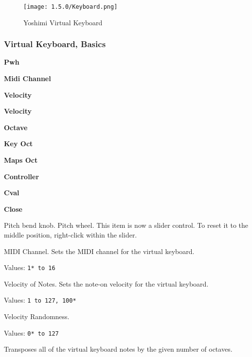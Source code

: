 \begin{figure}[H]
   \centering
   \texttt{[image: 1.5.0/Keyboard.png]}
   \caption{Yoshimi Virtual Keyboard}
   \label{fig:yoshimi_virtual_keyboard}
\end{figure}

\subsubsection{Virtual Keyboard, Basics}
\label{subsubsec:virtual_keyboard_basics}

   \begin{enumber}
      \item \textbf{Pwh}
      \item \textbf{Midi Channel}
      \item \textbf{Velocity}
      \item \textbf{Velocity}
      \item \textbf{Octave}
      \item \textbf{Key Oct}
      \item \textbf{Maps Oct}
      \item \textbf{Controller}
      \item \textbf{Cval}
      \item \textbf{Close}
   \end{enumber}

   Pitch bend knob. Pitch wheel.
   This item is now a slider control.  To reset it to the middle position,
   right-click within the slider.

%

   MIDI Channel.
   Sets the MIDI channel for the virtual keyboard.

   Values: \texttt{1* to 16}

   Velocity of Notes.
   Sets the note-on velocity for the virtual keyboard.

   Values: \texttt{1 to 127, 100*}

   Velocity Randomness.

   Values: \texttt{0* to 127}

   Transposes all of the virtual keyboard notes by the given number of
   octaves.

